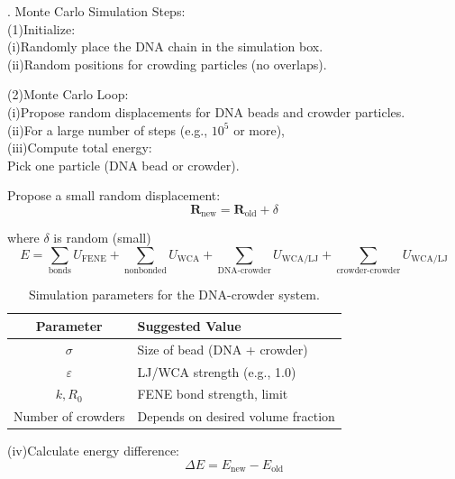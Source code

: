 \documentclass[12pt]{article}
\begin{document}
\begin{flushleft}
. Monte Carlo Simulation Steps:\\
(1)Initialize:\\
\setlength{\parindent}{6em} (i)Randomly place the DNA chain in the simulation box.\\
   (ii)Random positions for crowding particles (no overlaps).

\setlength{\parindent}{0em} 

\setlength{\parindent}{4em}(2)Monte Carlo Loop:\\
\setlength{\parindent}{6em}   (i)Propose random displacements for DNA beads and crowder particles.\\

(ii)For a large number of steps (e.g., $10^{5}$ or more),\\
(iii)Compute total energy:\\
\setlength{\parindent}{8em}Pick one particle (DNA bead or crowder).

Propose a small random displacement:
\begin{equation}
\mathbf{R}_{\text{new}} = \mathbf{R}_{\text{old}} + \delta
\end{equation}

\setlength{\parindent}{95pt}where \(\delta\) is random (small)
\begin{equation}
E = \sum_{\text{bonds}} U_{\mathrm{FENE}} + \sum_{\text{nonbonded}} U_{\mathrm{WCA}} 
+ \sum_{\text{DNA-crowder}} U_{\mathrm{WCA/LJ}} 
+ \sum_{\text{crowder-crowder}} U_{\mathrm{WCA/LJ}}
\end{equation}

\begin{table}[htbp]
\centering
\begin{tabular}{|c|l|}
\hline
\textbf{Parameter} & \textbf{Suggested Value} \\
\hline
$\sigma$ & Size of bead (DNA + crowder) \\
\hline
$\varepsilon$ & LJ/WCA strength (e.g., 1.0) \\
\hline
$k, R_0$ & FENE bond strength, limit \\
\hline
Number of crowders & Depends on desired volume fraction \\
\hline
\end{tabular}
\caption{Simulation parameters for the DNA-crowder system.}
\end{table}


\setlength{\parindent}{0em}
\setlength{\parindent}{6em}

(iv)Calculate energy difference:
\begin{equation}
\Delta E = E_{\text{new}} - E_{\text{old}}
\end{equation}





\end{flushleft}
\end{document}
